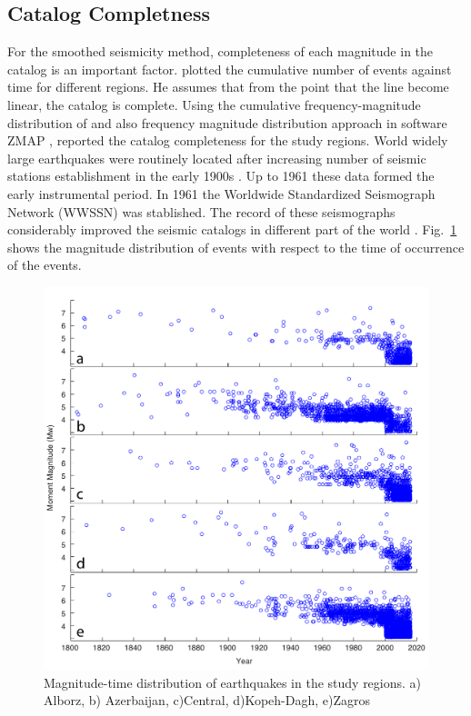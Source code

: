 \subsection{Catalog Completness}
For the smoothed seismicity method, completeness of each magnitude in the catalog is an important factor.  \citet{Frankel1995} plotted the cumulative number of events against time for different regions. He assumes that from the point that the line become linear, the catalog is complete. Using the cumulative frequency-magnitude distribution of \citet{Gutenberg1944} and also frequency magnitude distribution approach in software ZMAP \citep{Wiemer2001}, \citet{Zare2014} reported the catalog completeness for the study regions. World widely large earthquakes were routinely located after increasing number of seismic stations establishment in the early 1900s \citep{Shearer2009}. Up to 1961 these data formed the early instrumental period. In 1961 the Worldwide Standardized Seismograph Network (WWSSN) was stablished. The record of these seismographs considerably improved the seismic catalogs in different part of the world \citep{Shearer2009}. Fig.~\ref{fig:completness_scatter} shows the magnitude distribution of events with respect to the time of occurrence of the events.

\begin{figure} [!ht]
\centering
\includegraphics[scale=0.6]{figures/pdf/completness_scatter.pdf} 
\caption{Magnitude-time distribution of earthquakes in the study regions. a) Alborz, b) Azerbaijan, c)Central, d)Kopeh-Dagh, e)Zagros}
\label{fig:completness_scatter}
\end{figure}

